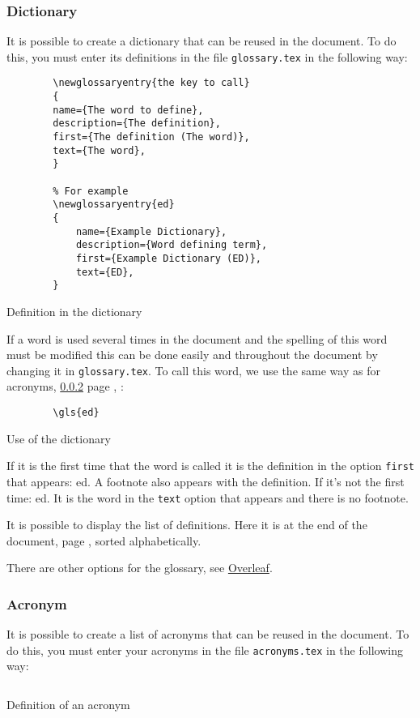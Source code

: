 \subsubsection{Dictionary} \label{dictionary}
It is possible to create a dictionary that can be reused in the document.
To do this, you must enter its definitions in the file \verb=glossary.tex= in the following way:
\begin{code}
    \begin{verbatim}
        \newglossaryentry{the key to call}
        {
        name={The word to define},
        description={The definition},
        first={The definition (The word)},
        text={The word},
        }

        % For example
        \newglossaryentry{ed}
        {
            name={Example Dictionary},
            description={Word defining term},
            first={Example Dictionary (ED)},
            text={ED},
        }
\end{verbatim}
    \caption{Definition in the dictionary}
\end{code}

If a word is used several times in the document and the spelling of this word must be modified
this can be done easily and throughout the document by changing it in \verb=glossary.tex=.
To call this word, we use the same way as for acronyms, \ref{acronym} page \pageref{acronym}, :
\begin{code}
    \begin{verbatim}
        \gls{ed}
\end{verbatim}
    \caption{Use of the dictionary}
\end{code}

If it is the first time that the word is called it is the definition in the option \verb=first= that appears: \gls{ed}.
A footnote also appears with the definition. \newline
If it's not the first time: \gls{ed}. It is the word in the \verb=text= option that appears and there is no footnote.

It is possible to display the list of definitions. Here it is at the end of the document,
page \pageref{domaindictionary}, sorted alphabetically.

There are other options for the glossary, see \href{https://fr.overleaf.com/learn/latex/Glossaries}{Overleaf}.

\subsubsection{Acronym} \label{acronym}
It is possible to create a list of acronyms that can be reused in the document.
To do this, you must enter your acronyms in the file \verb=acronyms.tex= in the following way:
\begin{code}
    \inputminted{latex}{./acronyms.tex}
    \caption{Definition of an acronym}
\end{code}

